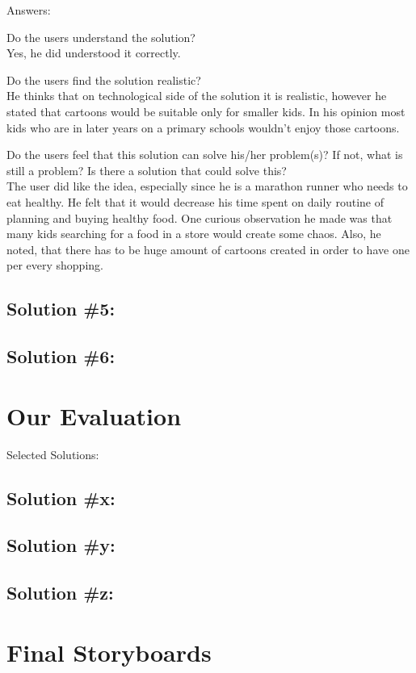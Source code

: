 \documentclass[a4paper,10pt,oneside]{scrreprt}
\begin{document}
Answers:
\begin{compactitem}
	\item Do the users understand the solution?\\
		Yes, he did understood it correctly.\\
	
	\item Do the users find the solution realistic?\\
		He thinks that on technological side of the solution it is realistic, however he stated that cartoons would be suitable only for smaller kids. In his opinion 
most kids who are in later years on a primary schools wouldn't enjoy those cartoons.
\\
		
	\item Do the users feel that this solution can solve his/her problem(s)? If not, what is still
	a problem? Is there a solution that could solve this?\\
		The user did like the idea, especially since he is a marathon runner who needs to eat healthy. He felt that
it would decrease his time spent on daily routine of planning and buying healthy food. One curious observation he made was that many kids searching for a food 
in a store would create some chaos. Also, he noted, that there has to be huge amount of cartoons created in order to have one per every shopping.

\end{compactitem}

\clearpage
\section{Solution \#5:}

\clearpage
\section{Solution \#6:}

\chapter{Our Evaluation}

Selected Solutions:\\

\section{Solution \#x:}

\section{Solution \#y:}

\section{Solution \#z:}

\chapter{Final Storyboards}
				
\end{document}
